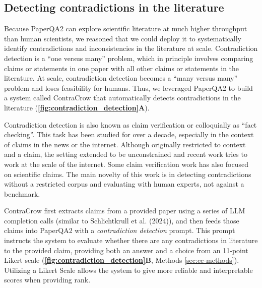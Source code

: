\documentclass{article}
\begin{document}
\begin{bibunit}[unsrt]
\section{Detecting contradictions in the literature}

Because PaperQA2 can explore scientific literature at much higher throughput than human scientists, we reasoned that we could deploy it to systematically identify contradictions and inconsistencies in the literature at scale. Contradiction detection is a ``one versus many'' problem, which in principle involves comparing claims or statements in one paper with all other claims or statements in the literature. At scale, contradiction detection becomes a ``many versus many'' problem and loses feasibility for humans. Thus, we leveraged PaperQA2 to build a system called ContraCrow that automatically detects contradictions in the literature (\textbf{\autoref{fig:contradiction_detection}A}). 

Contradiction detection is also known as claim verification or colloquially as ``fact checking''\cite{vlachos2014fact}. This task has been studied for over a decade, especially in the context of claims in the news or the internet\cite{vlachos2014fact, ferreira2016emergent}. Although originally restricted to context and a claim, the setting extended to be unconstrained\cite{popat2017truth} and recent work tries to work at the scale of the internet\cite{schlichtkrull2024averitec}. Some claim verification work has also focused on scientific claims\cite{wadden2020fact, wadden2021multivers}. The main novelty of this work is in detecting contradictions without a restricted corpus and evaluating with human experts, not against a benchmark. 

ContraCrow first extracts claims from a provided paper using a series of LLM completion calls (similar to Schlichtkrull et al. (2024)\cite{schlichtkrull2024averitec}), and then feeds those claims into PaperQA2 with a \textit{contradiction detection} prompt. This prompt instructs the system to evaluate whether there are any contradictions in literature to the provided claim, providing both an answer and a choice from an 11-point Likert scale (\textbf{\autoref{fig:contradiction_detection}B}, Methods \autoref{sec:cc-methods}). Utilizing a Likert Scale allows the system to give more reliable and interpretable scores when providing rank\cite{abeysinghe2024challenges}.


\end{bibunit}
\end{document}
